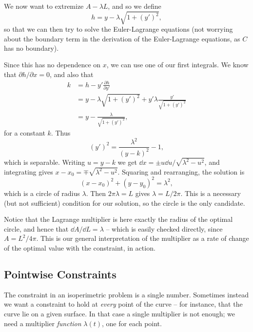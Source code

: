 \begin{example}
	We now want to extremize $A - \lambda L$, and so we define
	$$
	h = y - \lambda \sqrt{1 + (y')^2},
	$$
	so that we can then try to solve the Euler-Lagrange equations (not worrying about the boundary term in the derivation of the Euler-Lagrange equations, as $C$ has no boundary).

	Since this has no dependence on $x$, we can use one of our first integrals. We know that $\partial h/\partial x = 0$, and also that
	\begin{align*}
		k &= h - y' \frac{\partial h}{\partial y'} \\
		  &= y - \lambda \sqrt{1 + (y')^2} + y' \lambda \frac{y'}{\sqrt{1 + (y')^2}}\\
		  &= y - \frac{\lambda}{\sqrt{1 + (y')^2}},
	\end{align*}
	for a constant $k$. Thus
	$$
	(y')^2 = \frac{\lambda^2}{(y - k)^2} - 1,
	$$
	which is separable. Writing $u = y - k$ we get $\dd x = \pm u\dd u/\sqrt{\lambda^2 - u^2}$, and integrating gives $x - x_0 = \mp\sqrt{\lambda^2 - u^2}$. Squaring and rearranging, the solution is
	$$
	(x - x_0)^2 + (y - y_0)^2 = \lambda^2,
	$$
	which is a circle of radius $\lambda$. Then $2\pi \lambda = L$ gives $\lambda = L/2\pi$. This is a necessary (but not sufficient) condition for our solution, so the circle is the only candidate.

	Notice that the Lagrange multiplier is here exactly the radius of the optimal circle, and hence that $\dd A/\dd L = \lambda$ -- which is easily checked directly, since $A = L^2/4\pi$. This is our general interpretation of the multiplier as a rate of change of the optimal value with the constraint, in action.
\end{example}

\subsection{Pointwise Constraints}

The constraint in an isoperimetric problem is a single number. Sometimes instead we want a constraint to hold at \emph{every} point of the curve -- for instance, that the curve lie on a given surface. In that case a single multiplier is not enough; we need a multiplier \emph{function} $\lambda(t)$, one for each point.

